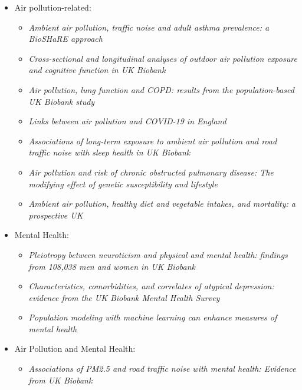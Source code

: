 \begin{itemize}
    \item Air pollution-related:
    \begin{itemize}
        \item \textit{Ambient air pollution, traffic noise and adult asthma prevalence: a BioSHaRE approach} \cite{Cai2016AmbientApproach}
        \item \textit{Cross-sectional and longitudinal analyses of outdoor air pollution exposure and cognitive function in UK Biobank} \cite{Cullen2018Cross-sectionalBiobank}
        \item \textit{Air pollution, lung function and COPD: results from the population-based UK Biobank study} \cite{Doiron2019AirStudy}
        \item \textit{Links between air pollution and COVID-19 in England} \cite{Travaglio2021LinksEngland} 
        \item \textit{Associations of long-term exposure to ambient air pollution and road traffic noise with sleep health in UK Biobank} \cite{Li2022AssociationsBiobank}
        \item \textit{Air pollution and risk of chronic obstructed pulmonary disease: The modifying effect of genetic susceptibility and lifestyle} \cite{Wang2022AirLifestyle}
        \item \textit{Ambient air pollution, healthy diet and vegetable intakes, and mortality: a prospective UK} \cite{Wang2022AmbientStudy}
    \end{itemize}
    
    \item Mental Health:
    \begin{itemize}
        \item \textit{Pleiotropy between neuroticism and physical and mental health: findings from 108,038 men and women in UK Biobank} \cite{Gale2016PleiotropyBiobank}
        \item \textit{Characteristics, comorbidities, and correlates of atypical depression: evidence from the UK Biobank Mental Health Survey} \cite{Brailean2020CharacteristicsSurvey}
        \item \textit{Population modeling with machine learning can enhance measures of mental health} \cite{Dadi2021PopulationHealth}
    \end{itemize}
    
    \item Air Pollution and Mental Health:
    \begin{itemize}
        \item \textit{Associations of PM2.5 and road traffic noise with mental health: Evidence from UK Biobank} \cite{Hao2022AssociationsBiobank}
    \end{itemize}
\end{itemize}

